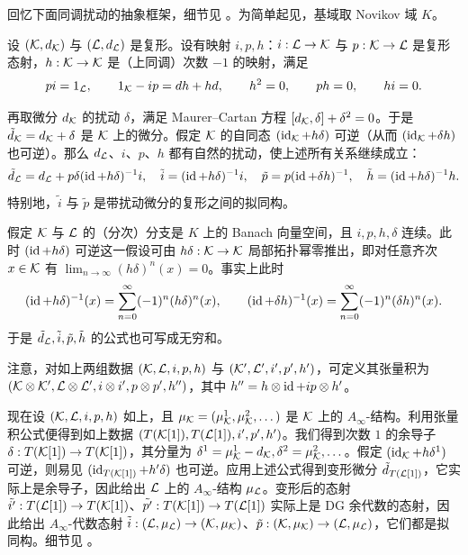 回忆下面同调扰动的抽象框架，细节见 \cite{CL}。为简单起见，基域取 Novikov 域 $K$。

设 $(\mathcal{K},d_{\mathcal{K}})$ 与 $(\mathcal{L},d_{\mathcal{L}})$ 是复形。设有映射 $i,p,h$：$i:\mathcal{L}\to\mathcal{K}$ 与 $p:\mathcal{K}\to \mathcal{L}$ 是复形态射，$h:\mathcal{K}\to\mathcal{K}$ 是（上同调）次数 $-1$ 的映射，满足
\[
pi=1_{\mathcal{L}},\qquad 1_{\mathcal{K}}-ip=dh+hd,\qquad h^2=0,\qquad ph=0,\qquad hi=0.
\]

再取微分 $d_{\mathcal{K}}$ 的扰动 $\delta$，满足 Maurer--Cartan 方程 $[d_{\mathcal{K}},\delta]+\delta^2=0$。于是 $\tilde{d}_{\mathcal{K}}=d_{\mathcal{K}}+\delta$ 是 $\mathcal{K}$ 上的微分。假定 $\mathcal{K}$ 的自同态 $(\operatorname{id}_{\mathcal{K}}+h\delta)$ 可逆（从而 $(\operatorname{id}_{\mathcal{K}}+\delta h)$ 也可逆）。那么 $d_{\mathcal{L}}$、$i$、$p$、$h$ 都有自然的扰动，使上述所有关系继续成立：
\[
\tilde{d}_{\mathcal{L}}=d_{\mathcal{L}}+p\delta(\operatorname{id}+h\delta)^{-1}i,\quad
\tilde{i}=(\operatorname{id}+h\delta)^{-1}i,\quad
\tilde{p}=p(\operatorname{id}+\delta h)^{-1},\quad
\tilde{h}=(\operatorname{id}+h\delta)^{-1}h.
\]
特别地，$\tilde{i}$ 与 $\tilde{p}$ 是带扰动微分的复形之间的拟同构。

\begin{remark}\label{remark:top_nilpotent}
假定 $\mathcal{K}$ 与 $\mathcal{L}$ 的（分次）分支是 $K$ 上的 Banach 向量空间，且 $i,p,h,\delta$ 连续。此时 $(\operatorname{id}+h\delta)$ 可逆这一假设可由 $h\delta:\mathcal{K}\to\mathcal{K}$ 局部拓扑幂零推出，即对任意齐次 $x\in\mathcal{K}$ 有 $\lim_{n\to\infty}(h\delta)^n(x)=0$。事实上此时
\[
(\operatorname{id}+h\delta)^{-1}(x)=\sum_{n=0}^{\infty}(-1)^n(h\delta)^n(x),\qquad
(\operatorname{id}+\delta h)^{-1}(x)=\sum_{n=0}^{\infty}(-1)^n(\delta h)^n(x).
\]
于是 $\tilde{d}_{\mathcal{L}},\tilde{i},\tilde{p},\tilde{h}$ 的公式也可写成无穷和。
\end{remark}

注意，对如上两组数据 $(\mathcal{K},\mathcal{L},i,p,h)$ 与 $(\mathcal{K}',\mathcal{L}',i',p',h')$，可定义其张量积为 $(\mathcal{K}\otimes\mathcal{K}',\mathcal{L}\otimes\mathcal{L}',i\otimes i', p\otimes p',h'')$，其中 $h''=h\otimes\operatorname{id}+ip\otimes h'$。

现在设 $(\mathcal{K},\mathcal{L},i,p,h)$ 如上，且 $\mu_{\mathcal{K}}=(\mu_{\mathcal{K}}^1,\mu_{\mathcal{K}}^2,\dots)$ 是 $\mathcal{K}$ 上的 $A_{\infty}$-结构。利用张量积公式便得到如上数据 $(T(\mathcal{K}[1]),T(\mathcal{L}[1]),i',p',h')$。我们得到次数 $1$ 的余导子 $\delta:T(\mathcal{K}[1])\to T(\mathcal{K}[1])$，其分量为 $\delta^1=\mu^1_{\mathcal{K}}-d_{\mathcal{K}},\delta^2=\mu^2_{\mathcal{K}},\dots$。假定 $(\operatorname{id}_{\mathcal{K}}+h\delta^1)$ 可逆，则易见 $(\operatorname{id}_{T(\mathcal{K}[1])}+h'\delta)$ 也可逆。应用上述公式得到变形微分 $\tilde{d}_{T(\mathcal{L}[1])}$，它实际上是余导子，因此给出 $\mathcal{L}$ 上的 $A_{\infty}$-结构 $\mu_{\mathcal{L}}$。变形后的态射 $\tilde{i'}:T(\mathcal{L}[1])\to T(\mathcal{K}[1])$、$\tilde{p'}:T(\mathcal{K}[1])\to T(\mathcal{L}[1])$ 实际上是 DG 余代数的态射，因此给出 $A_{\infty}$-代数态射 $\tilde{i}:(\mathcal{L},\mu_{\mathcal{L}})\to (\mathcal{K},\mu_{\mathcal{K}})$、$\tilde{p}:(\mathcal{K},\mu_{\mathcal{K}})\to (\mathcal{L},\mu_{\mathcal{L}})$，它们都是拟同构。细节见 \cite[Section 3.3]{CL}。

